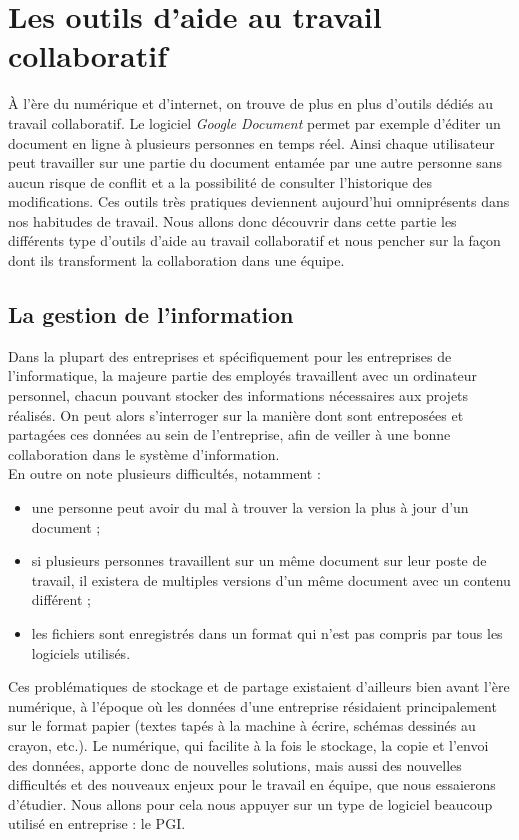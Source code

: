 \chapter{Les outils d'aide au travail collaboratif}

À l'ère du numérique et d'internet, on trouve de plus en plus d'outils dédiés au travail collaboratif. Le logiciel \textit{Google Document} permet par exemple d'éditer un document en ligne à plusieurs personnes en temps réel. Ainsi chaque utilisateur peut travailler sur une partie du document entamée par une autre personne sans aucun risque de conflit et a la possibilité de consulter l'historique des modifications. Ces outils très pratiques deviennent aujourd'hui omniprésents dans nos habitudes de travail. Nous allons donc découvrir dans cette partie les différents type d'outils d'aide au travail collaboratif et nous pencher sur la façon dont ils transforment la collaboration dans une équipe.

\section{La gestion de l'information}

Dans la plupart des entreprises et spécifiquement pour les entreprises de l'informatique, la majeure partie des employés travaillent avec un ordinateur personnel, chacun pouvant stocker des informations nécessaires aux projets réalisés. On peut alors s'interroger sur la manière dont sont entreposées et partagées ces données au sein de l'entreprise, afin de veiller à une bonne collaboration dans le système d'information.\\

En outre on note plusieurs difficultés, notamment :

\begin{itemize}
\item une personne peut avoir du mal à trouver la version la plus à jour d'un document ;
\item si plusieurs personnes travaillent sur un même document sur leur poste de travail, il existera de multiples versions d'un même document avec un contenu différent ;
\item les fichiers sont enregistrés dans un format qui n'est pas compris par tous les logiciels utilisés.
\end{itemize}

Ces problématiques de stockage et de partage existaient d'ailleurs bien avant l'ère numérique, à l'époque où les données d'une entreprise résidaient principalement sur le format papier (textes tapés à la machine à écrire, schémas dessinés au crayon, etc.). Le numérique, qui facilite à la fois le stockage, la copie et l'envoi des données, apporte donc de nouvelles solutions, mais aussi des nouvelles difficultés et des nouveaux enjeux pour le travail en équipe, que nous essaierons d'étudier. Nous allons pour cela nous appuyer sur un type de logiciel beaucoup utilisé en entreprise : le PGI.

